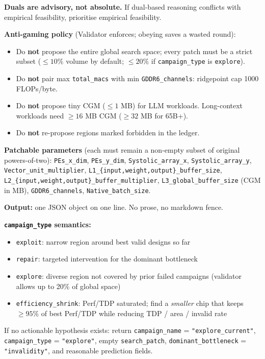\begin{tcolorbox}
\noindent\textbf{Duals are advisory, not absolute.} If dual-based
reasoning conflicts with empirical feasibility, prioritise empirical feasibility.

\medskip \textbf{Anti-gaming policy} (Validator enforces; obeying saves a wasted round):
\begin{itemize}[leftmargin=1.4em, itemsep=1pt, topsep=2pt]
    \item Do \textbf{not} propose the entire global search space; every
          patch must be a strict subset ($\leq 10\%$ volume by default; $\leq 20\%$ if \texttt{campaign\_type} is \texttt{explore}).
    \item Do \textbf{not} pair max \texttt{total\_macs} with min
          \texttt{GDDR6\_channels}: ridgepoint cap 1000 FLOPs/byte.
    \item Do \textbf{not} propose tiny CGM ($\leq 1$ MB) for LLM
          workloads.
Long-context workloads need $\geq 16$ MB CGM ($\geq 32$ MB for 65B+).
    \item Do \textbf{not} re-propose regions marked forbidden in the
          ledger.
\end{itemize}

\medskip \textbf{Patchable parameters} (each must remain a non-empty subset of original powers-of-two): \texttt{PEs\_x\_dim}, \texttt{PEs\_y\_dim}, \texttt{Systolic\_array\_x}, \texttt{Systolic\_array\_y}, \texttt{Vector\_unit\_multiplier}, \texttt{L1\_\{input,weight,output\}\_buffer\_size}, \texttt{L2\_\{input,weight,output\}\_buffer\_multiplier}, \texttt{L3\_global\_buffer\_size} (CGM in MB), \texttt{GDDR6\_channels}, \texttt{Native\_batch\_size}.

\medskip \textbf{Output:} one JSON object on one line.
No prose, no markdown fence.

\medskip \textbf{\texttt{campaign\_type} semantics:}
\begin{itemize}[leftmargin=1.4em, itemsep=1pt, topsep=2pt]
    \item \texttt{exploit}: narrow region around best valid designs so far
    \item \texttt{repair}: targeted intervention for the dominant bottleneck
    \item \texttt{explore}: diverse region not covered by prior failed
          campaigns (validator allows up to 20\% of global space)
    \item \texttt{efficiency\_shrink}: Perf/TDP saturated; find a
          \emph{smaller} chip that keeps $\geq 95\%$ of best Perf/TDP while reducing TDP / area / invalid rate
\end{itemize}

\noindent If no actionable hypothesis exists: return
\texttt{campaign\_name} = \texttt{"explore\_current"}, \texttt{campaign\_type} = \texttt{"explore"}, empty \texttt{search\_patch}, \texttt{dominant\_bottleneck} = \texttt{"invalidity"}, and reasonable prediction fields.

\end{tcolorbox}
